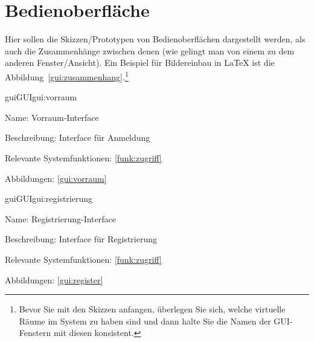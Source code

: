 
\section{Bedienoberfläche}

Hier sollen die Skizzen/Prototypen von Bedienoberflächen dargestellt werden, als auch die Zusammenhänge zwischen denen (wie gelingt man von einem zu dem anderen Fenster/Ansicht). Ein Beispiel für Bildereinbau in LaTeX ist die Abbildung~\ref{gui:zusammenhang}.\footnote{Bevor Sie mit den Skizzen anfangen, überlegen Sie sich, welche virtuelle Räume im System zu haben sind und dann halte Sie die Namen der GUI-Fenstern mit diesen konsistent.}

\setcounter{gui}{10}

\begin{description}[leftmargin=5em, style=sameline]	
	\begin{lhp}{gui}{GUI}{gui:vorraum}
		\item[Name:] Vorraum-Interface
		\item[Beschreibung:] Interface für Anmeldung
		\item[Relevante Systemfunktionen:] \ref{funk:zugriff}
		\item[Abbildungen:] \ref{gui:vorraum}
	\end{lhp}
\end{description}


\begin{description}[leftmargin=5em, style=sameline]	
	\begin{lhp}{gui}{GUI}{gui:registrierung}
		\item[Name:] Registrierung-Interface
		\item[Beschreibung:] Interface für Registrierung
		\item[Relevante Systemfunktionen:] \ref{funk:zugriff}
		\item[Abbildungen:]  \ref{gui:register}
	\end{lhp}
\end{description}

 %


